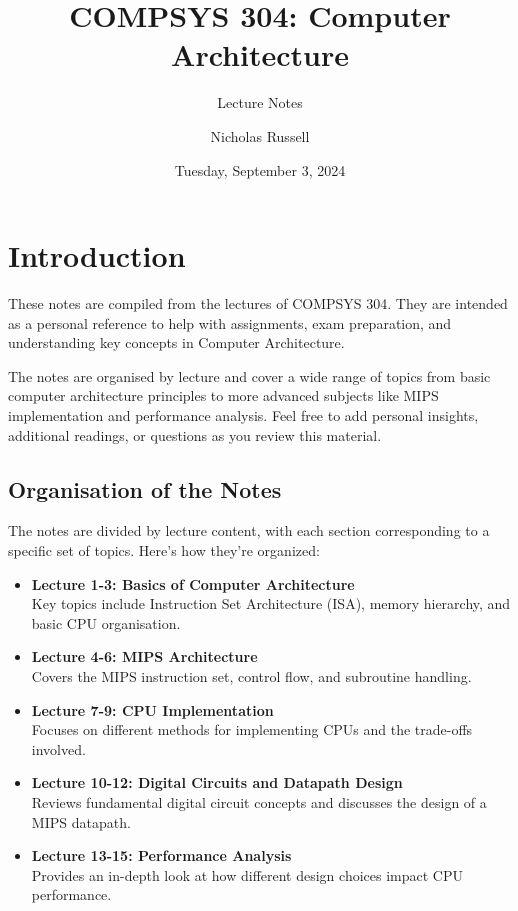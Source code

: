 \documentclass[
  14pt,
  a4paper,
  DIV=11,
  numbers=noendperiod,
  headinclude=true,
  footinclude=true]{scrreprt}
\title{COMPSYS 304: Computer Architecture}
\subtitle{Lecture Notes}
\author{Nicholas Russell}
\date{Tuesday, September 3, 2024}
\renewcommand*\contentsname{Table of contents}
\newcommand\contentsname{Table of contents}
\begin{document}
\maketitle

\renewcommand*\contentsname{Table of contents}
{
\hypersetup{linkcolor=}
\setcounter{tocdepth}{2}
\tableofcontents
}


\chapter*{Introduction}\label{introduction}


These notes are compiled from the lectures of COMPSYS 304. They are
intended as a personal reference to help with assignments, exam
preparation, and understanding key concepts in Computer Architecture.

The notes are organised by lecture and cover a wide range of topics from
basic computer architecture principles to more advanced subjects like
MIPS implementation and performance analysis. Feel free to add personal
insights, additional readings, or questions as you review this material.

\section*{Organisation of the Notes}\label{organisation-of-the-notes}


The notes are divided by lecture content, with each section
corresponding to a specific set of topics. Here's how they're organized:

\begin{itemize}
\item
  \textbf{Lecture 1-3: Basics of Computer Architecture}\\
  Key topics include Instruction Set Architecture (ISA), memory
  hierarchy, and basic CPU organisation.
\item
  \textbf{Lecture 4-6: MIPS Architecture}\\
  Covers the MIPS instruction set, control flow, and subroutine
  handling.
\item
  \textbf{Lecture 7-9: CPU Implementation}\\
  Focuses on different methods for implementing CPUs and the trade-offs
  involved.
\item
  \textbf{Lecture 10-12: Digital Circuits and Datapath Design}\\
  Reviews fundamental digital circuit concepts and discusses the design
  of a MIPS datapath.
\item
  \textbf{Lecture 13-15: Performance Analysis}\\
  Provides an in-depth look at how different design choices impact CPU
  performance.
\end{itemize}
\end{document}
